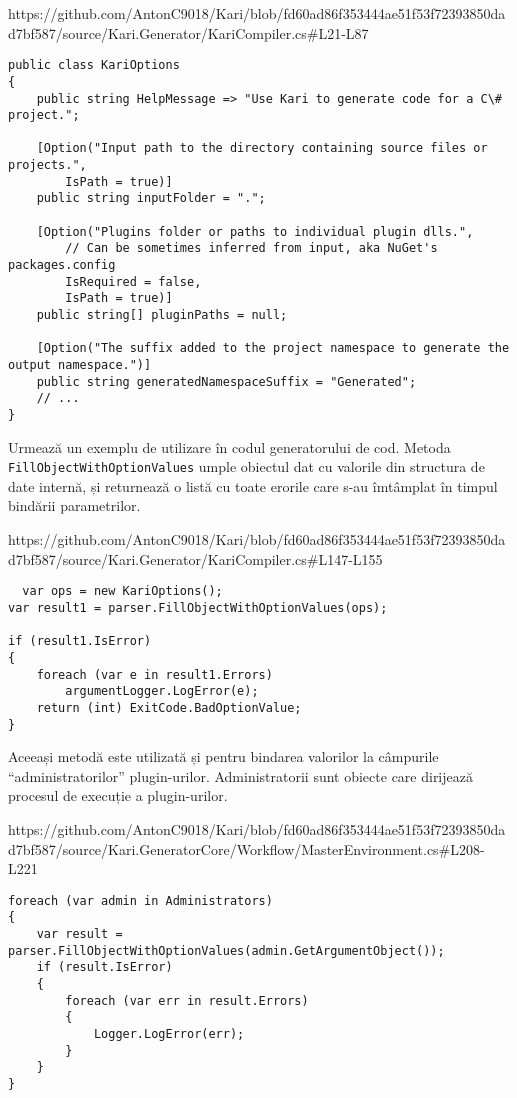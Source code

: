 \documentclass[a4paper,12pt]{report}
\begin{document}
https://github.com/AntonC9018/Kari/blob/fd60ad86f353444ae51f53f72393850dad7bf587/source/Kari.Generator/KariCompiler.cs#L21-L87

\begin{verbatim}
public class KariOptions
{
    public string HelpMessage => "Use Kari to generate code for a C\# project.";

    [Option("Input path to the directory containing source files or projects.", 
        IsPath = true)] 
    public string inputFolder = ".";

    [Option("Plugins folder or paths to individual plugin dlls.",
        // Can be sometimes inferred from input, aka NuGet's packages.config
        IsRequired = false,
        IsPath = true)]
    public string[] pluginPaths = null;

    [Option("The suffix added to the project namespace to generate the output namespace.")]
    public string generatedNamespaceSuffix = "Generated";
    // ...
}
\end{verbatim}

Urmează un exemplu de utilizare în codul generatorului de cod.
Metoda \texttt{FillObjectWithOptionValues} umple obiectul dat cu valorile din structura de date internă, și returnează o listă cu toate erorile care s-au îmtâmplat în timpul bindării parametrilor. 

https://github.com/AntonC9018/Kari/blob/fd60ad86f353444ae51f53f72393850dad7bf587/source/Kari.Generator/KariCompiler.cs#L147-L155

\begin{verbatim}
  var ops = new KariOptions();
var result1 = parser.FillObjectWithOptionValues(ops);

if (result1.IsError)
{
    foreach (var e in result1.Errors)
        argumentLogger.LogError(e);
    return (int) ExitCode.BadOptionValue;
}
\end{verbatim}

Aceeași metodă este utilizată și pentru bindarea valorilor la câmpurile ``administratorilor'' plugin-urilor.
Administratorii sunt obiecte care dirijează procesul de execuție a plugin-urilor.


https://github.com/AntonC9018/Kari/blob/fd60ad86f353444ae51f53f72393850dad7bf587/source/Kari.GeneratorCore/Workflow/MasterEnvironment.cs#L208-L221

\begin{verbatim}
foreach (var admin in Administrators)
{
    var result = parser.FillObjectWithOptionValues(admin.GetArgumentObject());
    if (result.IsError)
    {
        foreach (var err in result.Errors)
        {
            Logger.LogError(err);
        }
    }
}
\end{verbatim}
\end{document}
